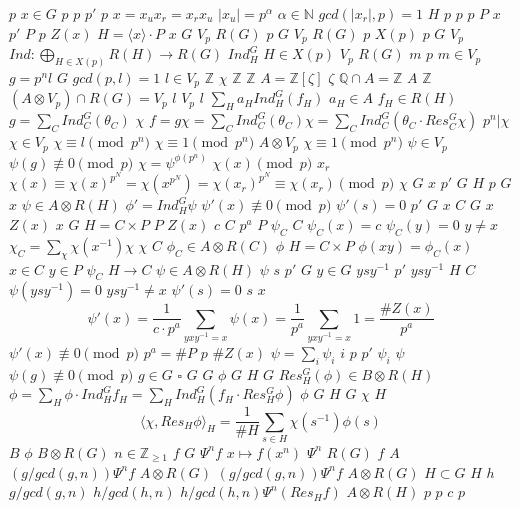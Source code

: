 \documentclass{article}
\begin{document}
$p$
$x \in G$
$p$
$p$
$p'$
$p$
$x=x_{u}x_{r}=x_{r}x_{u}$
$\lvert x_{u} \rvert=p^{\alpha}$
$\alpha \in \mathbb{N}$
$gcd(\lvert x_{r} \rvert,p)=1$
$H$
$p$
$p$
$p$
$P$
$x$
$p'$
$P$
$p$
$Z(x)$
$H=\langle x \rangle\cdot P$
$x$
$G$
$V_{p}$
$R(G)$
$p$
$G$
$V_{p}$
$R(G)$
$p$
$X(p)$
$p$
$G$
$V_{p}$
$Ind:\bigoplus_{H\in X(p)}R(H)\rightarrow R(G)$
$Ind_{H}^{G}$
$H\in X(p)$
$V_{p}$
$R(G)$
$m$
$p$
$m\in V_{p}$
$g=p^{n}l$
$G$
$gcd(p,l)=1$
$l\in V_{p}$
$\mathbb{Z}$
$\chi$
$\mathbb{Z}$
$\mathbb{Z}$
$A=\mathbb{Z}[\zeta]$
$\zeta$
$\mathbb{Q}\cap A=\mathbb{Z}$
$A$
$\mathbb{Z}$
$(A\otimes V_{p})\cap R(G)=V_{p}$
$l$
$V_{p}$
$l$
$\sum_{H}a_{H}Ind_{H}^{G}(f_{H})$
$a_{H}\in A$
$f_{H}\in R(H)$
$g=\sum_{C}Ind_{C}^{G}(\theta_{C})$
$\chi$
$f=g\chi=\sum_{C} Ind_{C}^{G}(\theta_{C})\chi=\sum_{C}Ind_{C}^{G}(\theta_{C}\cdot Res_{C}^{G}\chi)$
$p^{n}|\chi$
$\chi \in V_{p}$
$\chi\equiv l\pmod{p^{n}}$
$\chi\equiv1\pmod{p^{n}}$
$A\otimes V_{p}$
$\chi\equiv1\pmod{p^{n}}$
$\psi \in V_{p}$
$\psi(g)\not\equiv0\pmod{p}$
$\chi=\psi ^{\phi(p^{n})}$
$\chi(x)\pmod{p}$
$x_{r}$
$\chi(x)\equiv\chi(x)^{p^{N}}=\chi(x^{p^{N}})=\chi(x_{r})^{p^{N}}\equiv \chi(x_{r})\pmod{p}$
$\chi$
$G$
$x$
$p'$
$G$
$H$
$p$
$G$
$x$
$\psi \in A\otimes R(H)$
$\phi'=Ind_{H}^{G}\psi$
$\psi'(x)\not\equiv0\pmod{p}$
$\psi'(s)=0$
$p'$
$G$
$x$
$C$
$G$
$x$
$Z(x)$
$x$
$G$
$H=C\times P$
$P$
$Z(x)$
$c$
$C$
$p^{a}$
$P$
$\psi_{C}$
$C$
$\psi_{C}(x)=c$
$\psi_{C}(y)=0$
$y\neq x$
$\chi_{C}=\sum_{\chi}\chi(x^{-1})\chi$
$\chi$
$C$
$\phi_{C}\in A\otimes R(C)$
$\phi$
$H=C\times P$
$\phi(xy)=\phi_{C}(x)$
$x \in C$
$y\in P$
$\psi_{C}$
$H\rightarrow C$
$\psi \in A\otimes R(H)$
$\psi$
$s$
$p'$
$G$
$y\in G$
$ysy^{-1}$
$p'$
$ysy^{-1}$
$H$
$C$
$\psi(ysy^{-1})=0$
$ysy^{-1}\neq x$
$\psi'(s)=0$
$s$
$x$
$$\psi'(x)=\frac{1}{c\cdot p^{a}}\sum_{yxy^{-1}=x}\psi(x)= \frac{1}{p^{a}}\sum_{yxy^{-1}=x}1=\frac{\#Z(x)}{p^{a}}$$
$\psi'(x)\not\equiv0\pmod{p}$
$p^{a}=\#P$
$p$
$\#Z(x)$
$\psi=\sum_{i} \psi_{i}$
$i$
$p$
$p'$
$\psi_{i}$
$\psi$
$\psi(g)\not\equiv0\pmod{p}$
$g \in G$
$\square$
$G$
$G$
$\phi$
$G$
$H$
$G$
$Res^{G}_{H}(\phi)\in B\otimes R(H)$
$\phi=\sum_{H}\phi \cdot Ind_{H}^{G}f_{H}=\sum_{H}Ind_{H}^{G}(f_{H}\cdot Res_{H}^{G}\phi)$
$\phi$
$G$
$H$
$G$
$\chi$
$H$
$$
\langle \chi,Res_{H}\phi \rangle_{H}=\frac{1}{\#H} \sum_{s \in H} \chi(s^{-1})\phi(s)
$$
$B$
$\phi$
$B\otimes R(G)$
$n\in \mathbb{Z}_{\geq1}$
$f$
$G$
$\Psi^{n}f$
$x\mapsto f(x^{n})$
$\Psi^{n}$
$R(G)$
$f$
$A$
$(g / gcd(g,n))\Psi^{n}f$
$A\otimes R(G)$
$(g / gcd(g,n))\Psi^{n}f$
$A\otimes R(G)$
$H\subset G$
$H$
$h$
$g / gcd(g,n)$
$h / gcd(h,n)$
$h / gcd(h,n)\Psi^{n}(Res_{H}f)$
$A\otimes R(H)$
$p$
$p$
$c$
$p$
\end{document}
